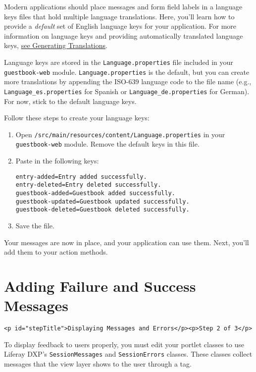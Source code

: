Modern applications should place messages and form field labels in a
language keys files that hold multiple language translations. Here,
you'll learn how to provide a \emph{default} set of English language
keys for your application. For more information on language keys and
providing automatically translated language keys,
\href{/docs/7-2/frameworks/-/knowledge_base/f/automatically-generating-translations}{see
Generating Translations}.

Language keys are stored in the \texttt{Language.properties} file
included in your \texttt{guestbook-web} module.
\texttt{Language.properties} is the default, but you can create more
translations by appending the ISO-639 language code to the file name
(e.g., \texttt{Language\_es.properties} for Spanish or
\texttt{Language\_de.properties} for German). For now, stick to the
default language keys.

Follow these steps to create your language keys:

\begin{enumerate}
\def\labelenumi{\arabic{enumi}.}
\item
  Open \texttt{/src/main/resources/content/Language.properties} in your
  \texttt{guestbook-web} module. Remove the default keys in this file.
\item
  Paste in the following keys:

\begin{verbatim}
entry-added=Entry added successfully.
entry-deleted=Entry deleted successfully.
guestbook-added=Guestbook added successfully.
guestbook-updated=Guestbook updated successfully.
guestbook-deleted=Guestbook deleted successfully.
\end{verbatim}
\item
  Save the file.
\end{enumerate}

Your messages are now in place, and your application can use them. Next,
you'll add them to your action methods.

\chapter{Adding Failure and Success
Messages}\label{adding-failure-and-success-messages}

\begin{verbatim}
<p id="stepTitle">Displaying Messages and Errors</p><p>Step 2 of 3</p>
\end{verbatim}

To display feedback to users properly, you must edit your portlet
classes to use Liferay DXP's \texttt{SessionMessages} and
\texttt{SessionErrors} classes. These classes collect messages that the
view layer shows to the user through a tag.

